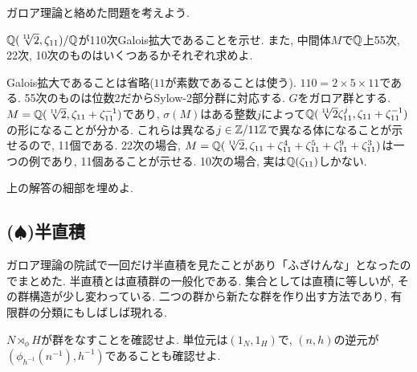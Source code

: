 ガロア理論と絡めた問題を考えよう.
\begin{egprob}
$\mathbb{Q}(\sqrt[11]{2}, \zeta_{11})/\mathbb{Q}$が110次Galois拡大であることを示せ. また, 中間体$M$で$\mathbb{Q}$上55次, 22次, 10次のものはいくつあるかそれぞれ求めよ.
\end{egprob}
\begin{egans}
Galois拡大であることは省略($11$が素数であることは使う). $110 = 2\times 5\times 11$である. 55次のものは位数2だからSylow-2部分群に対応する. $G$をガロア群とする.  $M=\mathbb{Q}(\sqrt[11]{2},\zeta_{11} + \zeta_{11}^{-1})$であり, $\sigma(M)$はある整数$j$によって$\mathbb{Q}(\sqrt[11]{2}\zeta_{11}^{j}, \zeta_{11}+\zeta_{11}^{-1})$の形になることが分かる. これらは異なる$j\in \mathbb{Z}/11\mathbb{Z}$で異なる体になることが示せるので, 11個である. 22次の場合, $M=\mathbb{Q}(\sqrt[11]{2}, \zeta_{11} + \zeta_{11}^{4} + \zeta_{11}^{5} + \zeta_{11}^{9} + \zeta_{11}^{3})$は一つの例であり, 11個あることが示せる. 10次の場合, 実は$\mathbb{Q}(\zeta_{11})$しかない.
\end{egans}
\begin{prac}
上の解答の細部を埋めよ.
\end{prac}










\newpage
\subsection{($\spadesuit$)半直積}
ガロア理論の院試で一回だけ半直積を見たことがあり「ふざけんな」となったのでまとめた. 半直積とは直積群の一般化である. 集合としては直積に等しいが, その群構造が少し変わっている. 二つの群から新たな群を作り出す方法であり, 有限群の分類にもしばしば現れる.

\begin{prac}
$N\rtimes_{\phi}H$が群をなすことを確認せよ. 単位元は$(1_N,1_H)$で, $(n,h)$の逆元が$(\phi_{h^{-1}}(n^{-1}), h^{-1})$であることも確認せよ.
\end{prac}

